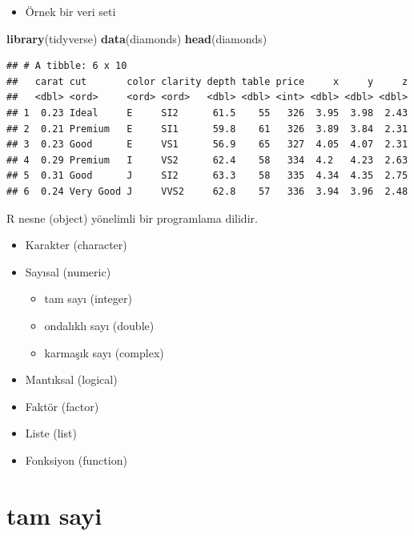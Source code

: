 \documentclass[
  oneside]{book}
\newenvironment{Shaded}{\begin{snugshade}}{\end{snugshade}}
\newcommand{\FunctionTok}[1]{\textcolor[rgb]{0.13,0.29,0.53}{\textbf{#1}}}
\newcommand{\NormalTok}[1]{#1}
\providecommand{\tightlist}{%
  \setlength{\itemsep}{0pt}\setlength{\parskip}{0pt}}
\begin{document}
\begin{itemize}
\tightlist
\item
  Örnek bir veri seti
\end{itemize}

\begin{Shaded}
\begin{Highlighting}[]
\FunctionTok{library}\NormalTok{(tidyverse)}
\FunctionTok{data}\NormalTok{(diamonds)}
\FunctionTok{head}\NormalTok{(diamonds)}
\end{Highlighting}
\end{Shaded}

\begin{verbatim}
## # A tibble: 6 x 10
##   carat cut       color clarity depth table price     x     y     z
##   <dbl> <ord>     <ord> <ord>   <dbl> <dbl> <int> <dbl> <dbl> <dbl>
## 1  0.23 Ideal     E     SI2      61.5    55   326  3.95  3.98  2.43
## 2  0.21 Premium   E     SI1      59.8    61   326  3.89  3.84  2.31
## 3  0.23 Good      E     VS1      56.9    65   327  4.05  4.07  2.31
## 4  0.29 Premium   I     VS2      62.4    58   334  4.2   4.23  2.63
## 5  0.31 Good      J     SI2      63.3    58   335  4.34  4.35  2.75
## 6  0.24 Very Good J     VVS2     62.8    57   336  3.94  3.96  2.48
\end{verbatim}

R nesne (object) yönelimli bir programlama dilidir.

\begin{itemize}
\tightlist
\item
  Karakter (character)
\item
  Sayısal (numeric)

  \begin{itemize}
  \tightlist
  \item
    tam sayı (integer)
  \item
    ondalıklı sayı (double)
  \item
    karmaşık sayı (complex)
  \end{itemize}
\item
  Mantıksal (logical)
\item
  Faktör (factor)
\item
  Liste (list)
\item
  Fonksiyon (function)
\end{itemize}

\hypertarget{tam-sayi}{%
\section{tam sayi}\label{tam-sayi}}
\end{document}
